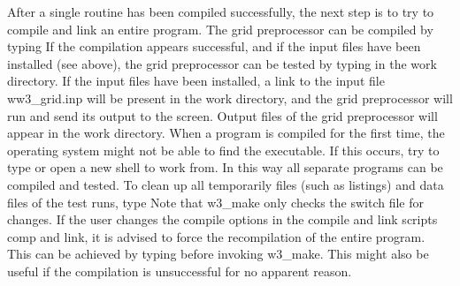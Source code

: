 After a single routine has been compiled successfully, the next step is to try
to compile and link an entire program. The grid preprocessor can be compiled
by typing  If the compilation appears successful,
and if the input files have been installed (see above), the grid preprocessor
can be tested by typing  in the work directory. If the
input files have been installed, a link to the input file {\file
ww3\_grid.inp} will be present in the work directory, and the grid
preprocessor will run and send its output to the screen. Output files of the
grid preprocessor will appear in the work directory. When a program is
compiled for the first time, the operating system might not be able to find
the executable. If this occurs, try to type  or open a new
shell to work from. In this way all separate programs can be compiled and
tested. To clean up all temporarily files (such as listings) and data files of
the test runs, type  Note that {\file w3\_make} only checks
the switch file for changes. If the user changes the compile options in the
compile and link scripts {\file comp} and {\file link}, it is advised to force
the recompilation of the entire program. This can be achieved by typing
 before invoking {\file w3\_make}. This
might also be useful if the compilation is unsuccessful for no apparent
reason.


